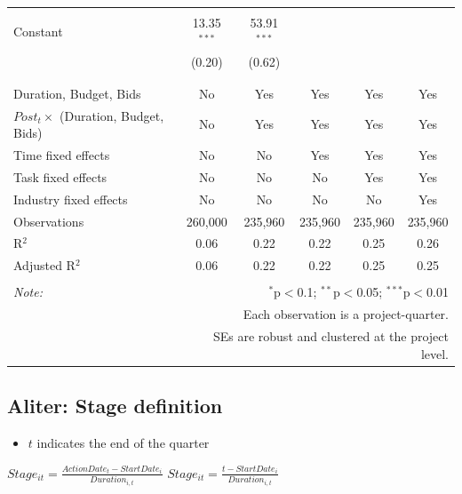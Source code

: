 \documentclass[
]{article}
\providecommand{\tightlist}{%
  \setlength{\itemsep}{0pt}\setlength{\parskip}{0pt}}
\begin{document}
\begin{table}[H]
\begin{tabular}{@{\extracolsep{-2pt}}lccccc}
  & & & & & \\ 
 Constant & 13.35$^{***}$ & 53.91$^{***}$ &  &  &  \\ 
  & (0.20) & (0.62) &  &  &  \\ 
  & & & & & \\ 
\hline \\[-1.8ex] 
Duration, Budget, Bids & No & Yes & Yes & Yes & Yes \\ 
$Post_t \times $  (Duration, Budget, Bids) & No & Yes & Yes & Yes & Yes \\ 
Time fixed effects & No & No & Yes & Yes & Yes \\ 
Task fixed effects & No & No & No & Yes & Yes \\ 
Industry fixed effects & No & No & No & No & Yes \\ 
Observations & 260,000 & 235,960 & 235,960 & 235,960 & 235,960 \\ 
R$^{2}$ & 0.06 & 0.22 & 0.22 & 0.25 & 0.26 \\ 
Adjusted R$^{2}$ & 0.06 & 0.22 & 0.22 & 0.25 & 0.25 \\ 
\hline 
\hline \\[-1.8ex] 
\textit{Note:}  & \multicolumn{5}{r}{$^{*}$p$<$0.1; $^{**}$p$<$0.05; $^{***}$p$<$0.01} \\ 
 & \multicolumn{5}{r}{Each observation is a project-quarter.} \\ 
 & \multicolumn{5}{r}{SEs are robust and clustered at the project level.} \\ 
\end{tabular} 
\end{table}

\hypertarget{aliter-stage-definition}{%
\subsection{Aliter: Stage definition}\label{aliter-stage-definition}}

\begin{itemize}
\tightlist
\item
  \(t\) indicates the end of the quarter
\end{itemize}

\(Stage_{it}=\frac{ActionDate_{t}-StartDate_i}{Duration_{i,t}}\)
\(Stage_{it}=\frac{t-StartDate_i}{Duration_{i,t}}\)
\end{document}
